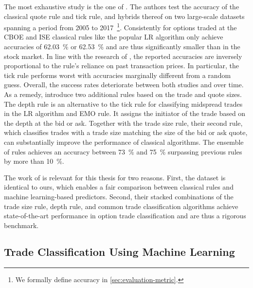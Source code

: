 The most exhaustive study is the one of \textcite[1--39]{grauerOptionTradeClassification2022}. The authors test the accuracy of the classical quote rule and tick rule, and hybrids thereof on two large-scale datasets spanning a period from 2005 to 2017~\footnote{We formally define accuracy in \cref{sec:evaluation-metric}.}. Consistently for options traded at the \gls{CBOE} and \gls{ISE} classical rules like the popular \gls{LR}  algorithm only achieve accuracies of \SI{62.03}{\percent} or \SI{62.53}{\percent} and are thus significantly smaller than in the stock market. In line with the research of \textcite[886]{savickasInferringDirectionOption2003}, the reported accuracies are inversely proportional to the rule's reliance on past transaction prices. In particular, the tick rule performs worst with accuracies marginally different from a random guess. Overall, the success rates deteriorate between both studies and over time. As a remedy, \textcite[14--17]{grauerOptionTradeClassification2022} introduce two additional rules based on the trade and quote sizes. The depth rule is an alternative to the tick rule for classifying midspread trades in the \gls{LR}  algorithm and \gls{EMO} rule. It assigns the initiator of the trade based on the depth at the bid or ask. Together with the trade size rule, their second rule, which classifies trades with a trade size matching the size of the bid or ask quote, can substantially improve the performance of classical algorithms. The ensemble of rules achieves an accuracy between \SI{73}{\percent} and \SI{75}{\percent} surpassing previous rules by more than \SI{10}{\percent}.

The work of \textcite[1--39]{grauerOptionTradeClassification2022} is relevant for this thesis for two reasons. First, the dataset is identical to ours, which enables a fair comparison between classical rules and machine learning-based predictors. Second, their stacked combinations of the trade size rule, depth rule, and common trade classification algorithms achieve state-of-the-art performance in option trade classification and are thus a rigorous benchmark.

\subsection{Trade Classification Using Machine Learning}
\label{sec:trade-classification-using-machine-learning}

